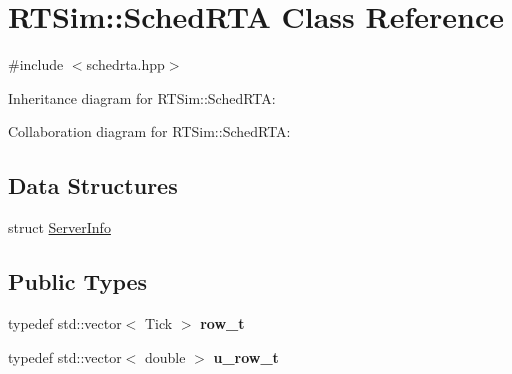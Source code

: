 \hypertarget{classRTSim_1_1SchedRTA}{}\section{R\+T\+Sim\+:\+:Sched\+R\+TA Class Reference}
\label{classRTSim_1_1SchedRTA}


{\ttfamily \#include $<$schedrta.\+hpp$>$}



Inheritance diagram for R\+T\+Sim\+:\+:Sched\+R\+TA\+:


Collaboration diagram for R\+T\+Sim\+:\+:Sched\+R\+TA\+:
\subsection*{Data Structures}
\begin{DoxyCompactItemize}
\item 
struct \hyperlink{structRTSim_1_1SchedRTA_1_1ServerInfo}{Server\+Info}
\end{DoxyCompactItemize}
\subsection*{Public Types}
\begin{DoxyCompactItemize}
\item 
typedef std\+::vector$<$ Tick $>$ {\bfseries row\+\_\+t}\hypertarget{classRTSim_1_1SchedRTA_adf8f57e44f2532be145d4922a8a7b185}{}\label{classRTSim_1_1SchedRTA_adf8f57e44f2532be145d4922a8a7b185}

\item 
typedef std\+::vector$<$ double $>$ {\bfseries u\+\_\+row\+\_\+t}\hypertarget{classRTSim_1_1SchedRTA_a821063f3e890c7026dcd81ad4ae38814}{}\label{classRTSim_1_1SchedRTA_a821063f3e890c7026dcd81ad4ae38814}

\end{DoxyCompactItemize}
